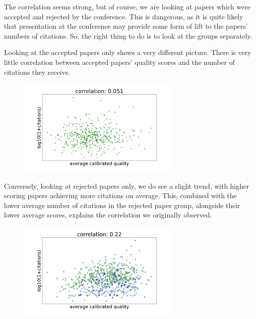 The correlation seems strong, but of course, we are looking at papers
which were accepted and rejected by the conference. This is dangerous,
as it is quite likely that presentation at the conference may provide
some form of lift to the papers' numbers of citations. So, the right
thing to do is to look at the groups separately.

Looking at the accepted papers only shows a very different picture.
There is very little correlation between accepted papers' quality scores
and the number of citations they receive.

\begin{figure}[htb]
\includegraphics[width=0.70\textwidth]{diagrams/neurips/citations-vs-average-calibrated-quality-accept.pdf}


\caption{}
\label{citations-vs-average-calibrated-quality-accept}
\end{figure}

Conversely, looking at rejected papers only, we do see a slight trend,
with higher scoring papers achieving more citations on average. This,
combined with the lower average number of citations in the rejected
paper group, alongside their lower average scores, explains the
correlation we originally observed.

\begin{figure}[htb]
\includegraphics[width=0.70\textwidth]{diagrams/neurips/citations-vs-average-calibrated-quality-reject.pdf}


\caption{}
\label{citations-vs-average-calibrated-quality-reject}
\end{figure}

